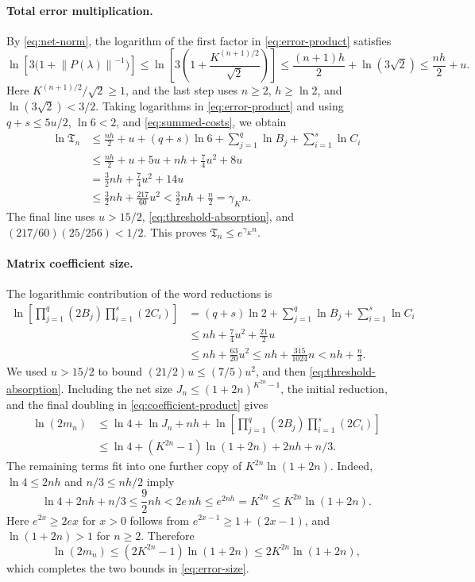 \documentclass[11pt]{article}
\numberwithin{equation}{section}
\theoremstyle{boldremark}\newtheorem{remark}[theorem]{Remark}
\newcommand{\norm}[1]{\left\lVert #1\right\rVert}
\begin{document}
\paragraph{Total error multiplication.}
By \eqref{eq:net-norm}, the logarithm of the first factor in
\eqref{eq:error-product} satisfies
\[
 \ln\!\left[3\bigl(1+\norm{P(\lambda)}^{-1}\bigr)\right]
 \le\ln\!\left[3\left(1+\frac{K^{(n+1)/2}}{\sqrt2}\right)\right]
 \le\frac{(n+1)h}{2}+\ln(3\sqrt2)
 \le\frac{nh}{2}+u.
\]
Here $K^{(n+1)/2}/\sqrt2\ge1$, and the last step uses $n\ge2$,
$h\ge\ln2$, and $\ln(3\sqrt2)<3/2$.
Taking logarithms in \eqref{eq:error-product} and using
$q+s\le5u/2$, $\ln6<2$, and \eqref{eq:summed-costs}, we obtain
\begin{align*}
 \ln\mathfrak T_n
 &\le\frac{nh}{2}+u+(q+s)\ln6
       +\sum_{j=1}^q\ln B_j+\sum_{i=1}^s\ln C_i\\
 &\le\frac{nh}{2}+u+5u+nh+\frac74u^2+8u\\
 &=\frac32nh+\frac74u^2+14u\\
 &\le\frac32nh+\frac{217}{60}u^2
 <\frac32nh+\frac n2=\gamma_Kn.
\end{align*}
The final line uses $u>15/2$, \eqref{eq:threshold-absorption},
and $(217/60)(25/256)<1/2$.
This proves $\mathfrak T_n\le e^{\gamma_Kn}$.

\paragraph{Matrix coefficient size.}
The logarithmic contribution of the word reductions is
\begin{align*}
 \ln\!\left[\prod_{j=1}^q(2B_j)\prod_{i=1}^s(2C_i)\right]
 &=(q+s)\ln2+\sum_{j=1}^q\ln B_j+\sum_{i=1}^s\ln C_i\\
 &\le nh+\frac74u^2+\frac{21}{2}u\\
 &\le nh+\frac{63}{20}u^2
 \le nh+\frac{315}{1024}n<nh+\frac n3.
\end{align*}
We used $u>15/2$ to bound $(21/2)u\le(7/5)u^2$, and then
\eqref{eq:threshold-absorption}. Including the net size
$J_n\le(1+2n)^{K^{2n}-1}$, the initial reduction, and the final
doubling in \eqref{eq:coefficient-product} gives
\begin{align*}
 \ln(2m_n)
 &\le\ln4+\ln J_n+nh
       +\ln\!\left[\prod_{j=1}^q(2B_j)\prod_{i=1}^s(2C_i)\right]\\
 &\le\ln4+(K^{2n}-1)\ln(1+2n)+2nh+n/3.
\end{align*}
The remaining terms fit into one further copy of
$K^{2n}\ln(1+2n)$. Indeed, $\ln4\le2nh$ and $n/3\le nh/2$ imply
\[
 \ln4+2nh+n/3\le\frac92nh
 <2e\,nh\le e^{2nh}=K^{2n}
 \le K^{2n}\ln(1+2n).
\]
Here $e^{2x}\ge2ex$ for $x>0$ follows from
$e^{2x-1}\ge1+(2x-1)$, and $\ln(1+2n)>1$ for $n\ge2$.
Therefore
\[
 \ln(2m_n)
 \le(2K^{2n}-1)\ln(1+2n)
 \le2K^{2n}\ln(1+2n),
\]
which completes the two bounds in \eqref{eq:error-size}.
\end{document}
